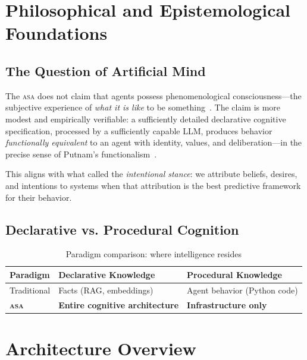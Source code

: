 \documentclass[12pt,a4paper,twoside]{article}
\theoremstyle{plain}
\theoremstyle{definition}
\theoremstyle{remark}
\newcommand{\ASA}{\textsc{asa}}
\begin{document}
\section{Philosophical and Epistemological Foundations}

\subsection{The Question of Artificial Mind}

The \ASA{} does not claim that agents possess phenomenological consciousness---the subjective experience of \emph{what it is like} to be something~\citep{nagel1974}. The claim is more modest and empirically verifiable: a sufficiently detailed declarative cognitive specification, processed by a sufficiently capable LLM, produces behavior \emph{functionally equivalent} to an agent with identity, values, and deliberation---in the precise sense of Putnam's functionalism~\citep{putnam1967}.

This aligns with what \citet{dennett1987} called the \emph{intentional stance}: we attribute beliefs, desires, and intentions to systems when that attribution is the best predictive framework for their behavior.

\subsection{Declarative vs. Procedural Cognition}

\begin{table}[H]
\centering
\caption{Paradigm comparison: where intelligence resides}
\begin{tabular}{lll}
\toprule
\textbf{Paradigm} & \textbf{Declarative Knowledge} & \textbf{Procedural Knowledge} \\
\midrule
Traditional & Facts (RAG, embeddings) & Agent behavior (Python code) \\
\textbf{\ASA{}} & \textbf{Entire cognitive architecture} & \textbf{Infrastructure only} \\
\bottomrule
\end{tabular}
\end{table}

\section{Architecture Overview}
\end{document}
